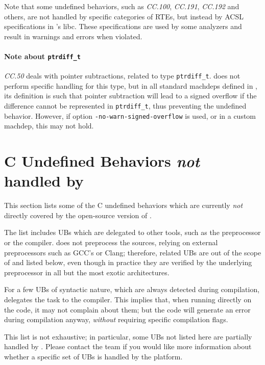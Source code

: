 Note that some undefined behaviors,
such as {\em CC.100}, {\em CC.191}, {\em CC.192} and others,
are not handled by specific categories of RTEs, but instead by ACSL
specifications in \FramaC's libc. These specifications are used by some
analyzers and result in warnings and errors when violated.

\paragraph{Note about \texttt{ptrdiff\_t}}
          {\em CC.50} deals with pointer subtractions, related to type \texttt{ptrdiff\_t}.
          \FramaC does not perform specific handling for this type,
          but in all standard machdeps defined in \FramaC, its definition
          is such that pointer subtraction will lead to a signed overflow
          if the difference cannot be represented in \texttt{ptrdiff\_t},
          thus preventing the undefined behavior. However, if option
          \texttt{-no-warn-signed-overflow} is used, or in a custom machdep,
          this may not hold.

\section{C Undefined Behaviors {\em not} handled by \FramaC}

This section lists some of the C undefined behaviors which are currently
{\em not} directly covered by the open-source version of \FramaC.

The list includes UBs which are delegated to other tools, such as the
preprocessor or the compiler.
\FramaC does not preprocess the sources, relying on external
preprocessors such as GCC's or Clang; therefore, related UBs are out of the
scope of \FramaC and listed below, even though in practice they are verified
by the underlying preprocessor in all but the most exotic architectures.

For a few UBs of syntactic nature, which are always detected during compilation,
\FramaC delegates the task to the compiler. This implies that, when running
\FramaC directly on the code, it may not complain about them; but the code
will generate an error during compilation anyway, {\em without} requiring
specific compilation flags.

This list is not exhaustive; in particular, some UBs not listed here are
partially handled by \FramaC. Please contact the \FramaC team if you would like
more information about whether a specific set of UBs is handled by the platform.

